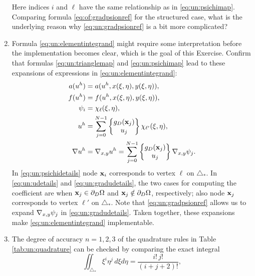 \begin{enumerate}
Here indices $i$ and $\ell$ have the same relationship as in \eqref{eq:un:psichimap}.  Comparing formula \eqref{eq:of:gradpsionref} for the structured case, what is the underlying reason why \eqref{eq:un:gradpsionref} is a bit more complicated?  %
\item  \label{exer:un:elementintegranddetails}  Formula \eqref{eq:un:elementintegrand} might require some interpretation before the implementation becomes clear, which is the goal of this Exercise.  Confirm that formulas \eqref{eq:un:trianglemap} and \eqref{eq:un:psichimap} lead to these expansions of expressions in \eqref{eq:un:elementintegrand}:
\begin{align}
a(u^h) &= a(u^h,x(\xi,\eta),y(\xi,\eta)), \label{eq:un:adetails} \\
f(u^h) &= f(u^h,x(\xi,\eta),y(\xi,\eta)), \label{eq:un:fdetails} \\
\psi_i &= \chi_{\ell}(\xi,\eta), \label{eq:un:psichidetails} \\
u^h &= \sum_{j=0}^{N-1} \left\{\begin{matrix} g_D(\mathbf{x}_j) \\ u_j \end{matrix}\right\} \chi_{\ell'}(\xi,\eta), \label{eq:un:udetails} \\
\nabla u^h &= \nabla_{x,y} u^h = \sum_{j=0}^{N-1} \left\{\begin{matrix} g_D(\mathbf{x}_j) \\ u_j \end{matrix}\right\} \nabla_{x,y} \psi_j. \label{eq:un:gradudetails}
\end{align}
In \eqref{eq:un:psichidetails} node $\mathbf{x}_i$ corresponds to vertex $\ell$ on $\triangle_\ast$.  In \eqref{eq:un:udetails} and \eqref{eq:un:gradudetails}, the two cases for computing the coefficient are when $\mathbf{x}_j \in \partial_D \Omega$ and $\mathbf{x}_j \notin \partial_D \Omega$, respectively; also node $\mathbf{x}_j$ corresponds to vertex $\ell'$ on $\triangle_\ast$.  Note that \eqref{eq:un:gradpsionref} allows us to expand $\nabla_{x,y} \psi_j$ in \eqref{eq:un:gradudetails}.  Taken together, these expansions make \eqref{eq:un:elementintegrand} implementable.
\item  \label{exer:un:checkquadrature}  The degree of accuracy $n=1,2,3$ of the quadrature rules in Table \ref{tab:un:quadrature} can be checked by comparing the exact integral
\begin{equation}
\iint_{\triangle_\ast} \xi^i \eta^j\,d\xi d\eta = \frac{i!\,j!}{(i+j+2)!}, \label{eq:un:checkquadrature}

\end{equation}
\end{enumerate}
